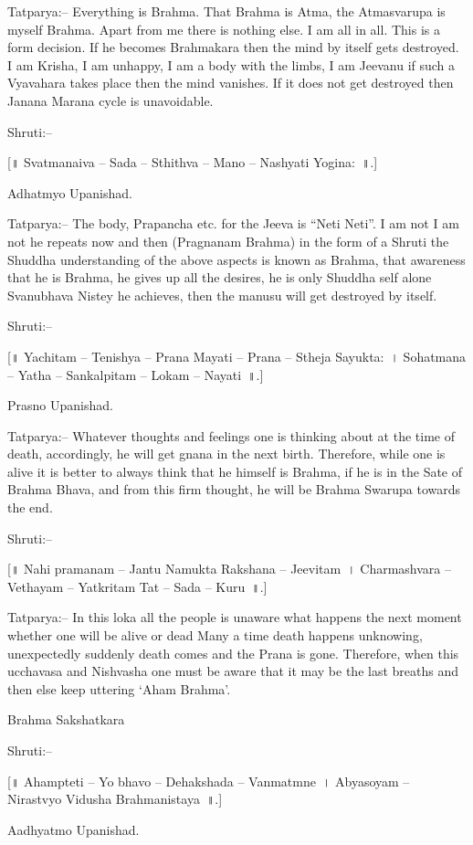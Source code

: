 Tatparya:– Everything is Brahma. That Brahma is Atma, the Atmasvarupa is myself Brahma. Apart from me there is nothing else. I am all in all. This is a form decision. If he becomes Brahmakara then the mind by itself gets destroyed. I am Krisha, I am unhappy, I am a body with the limbs, I am Jeevanu if such a Vyavahara takes place then the mind vanishes. If it does not get destroyed then Janana Marana cycle is unavoidable.

Shruti:–

[॥ Svatmanaiva – Sada – Sthithva – Mano – Nashyati Yogina:~॥.]

Adhatmyo Upanishad.

Tatparya:– The body, Prapancha etc. for the Jeeva is “Neti Neti”. I am not I am not he repeats now and then (Pragnanam Brahma) in the form of a Shruti the Shuddha understanding of the above aspects is known as Brahma, that awareness that he is Brahma, he gives up all the desires, he is only Shuddha self alone Svanubhava Nistey he achieves, then the manusu will get destroyed by itself.

Shruti:–

[॥ Yachitam – Tenishya – Prana Mayati – Prana – Stheja Sayukta:~। Sohatmana – Yatha – Sankalpitam – Lokam – Nayati~॥.]

Prasno Upanishad.

Tatparya:– Whatever thoughts and feelings one is thinking about at the time of death, accordingly, he will get gnana in the next birth. Therefore, while one is alive it is better to always think that he himself is Brahma, if he is in the Sate of Brahma Bhava, and from this firm thought, he will be Brahma Swarupa towards the end.

Shruti:–

[॥ Nahi pramanam – Jantu Namukta Rakshana – Jeevitam~। Charmashvara – Vethayam – Yatkritam Tat – Sada – Kuru~॥.]

Tatparya:– In this loka all the people is unaware what happens the next moment whether one will be alive or dead Many a time death happens unknowing, unexpectedly suddenly death comes and the Prana is gone. Therefore, when this ucchavasa and Nishvasha one must be aware that it may be the last breaths and then else keep uttering ‘Aham Brahma’.

Brahma Sakshatkara

Shruti:–

[॥ Ahampteti – Yo bhavo – Dehakshada – Vanmatmne~। Abyasoyam – Nirastvyo Vidusha Brahmanistaya~॥.]

Aadhyatmo Upanishad.

